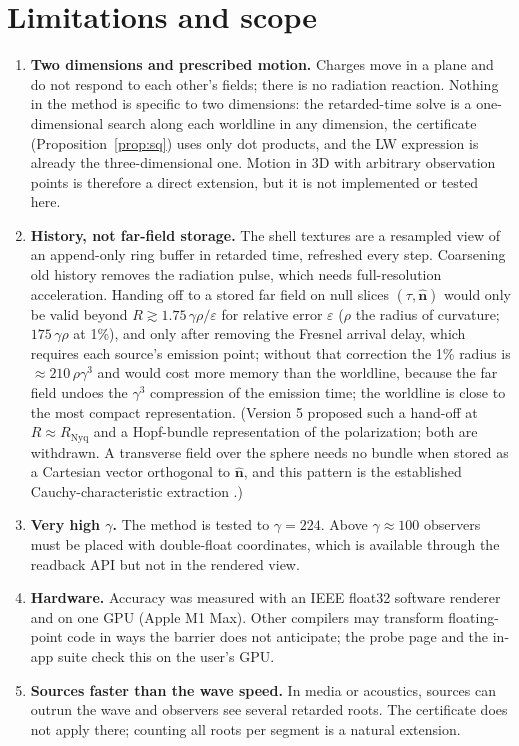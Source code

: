 \documentclass[11pt, a4paper]{article}
\begin{document}
\section{Limitations and scope}
\begin{enumerate}
    \item \textbf{Two dimensions and prescribed motion.} Charges move in a plane and do not respond to each other's fields; there is no radiation reaction. Nothing in the method is specific to two dimensions: the retarded-time solve is a one-dimensional search along each worldline in any dimension, the certificate (Proposition~\ref{prop:sq}) uses only dot products, and the LW expression is already the three-dimensional one. Motion in 3D with arbitrary observation points is therefore a direct extension, but it is not implemented or tested here.
    \item \textbf{History, not far-field storage.} The shell textures are a resampled view of an append-only ring buffer in retarded time, refreshed every step. Coarsening old history removes the radiation pulse, which needs full-resolution acceleration. Handing off to a stored far field on null slices $(\tau, \hat{\mathbf{n}})$ would only be valid beyond $R \gtrsim 1.75\,\gamma\rho/\varepsilon$ for relative error $\varepsilon$ ($\rho$ the radius of curvature; $175\,\gamma\rho$ at 1\%), and only after removing the Fresnel arrival delay, which requires each source's emission point; without that correction the 1\% radius is $\approx 210\,\rho\gamma^3$ and would cost more memory than the worldline, because the far field undoes the $\gamma^3$ compression of the emission time; the worldline is close to the most compact representation. (Version 5 proposed such a hand-off at $R \approx R_{\text{Nyq}}$ and a Hopf-bundle representation of the polarization; both are withdrawn. A transverse field over the sphere needs no bundle when stored as a Cartesian vector orthogonal to $\hat{\mathbf{n}}$, and this pattern is the established Cauchy-characteristic extraction \cite{bishop1997}.)
    \item \textbf{Very high $\gamma$.} The method is tested to $\gamma = 224$. Above $\gamma \approx 100$ observers must be placed with double-float coordinates, which is available through the readback API but not in the rendered view.
    \item \textbf{Hardware.} Accuracy was measured with an IEEE float32 software renderer and on one GPU (Apple M1 Max). Other compilers may transform floating-point code in ways the barrier does not anticipate; the probe page and the in-app suite check this on the user's GPU.
    \item \textbf{Sources faster than the wave speed.} In media or acoustics, sources can outrun the wave and observers see several retarded roots. The certificate does not apply there; counting all roots per segment is a natural extension.
\end{enumerate}
\end{document}
